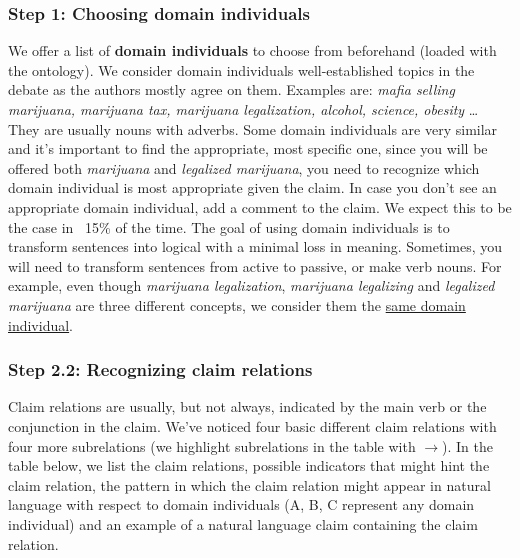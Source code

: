 \subsubsection{Step 1: Choosing domain individuals}

We offer a list of \textbf{domain individuals} to choose from beforehand (loaded with
the ontology). We consider domain individuals well-established topics in the
debate as the authors mostly agree on them. Examples are: \textit{mafia selling
marijuana, marijuana tax, marijuana legalization, alcohol, science, obesity} \dots
They are usually nouns with adverbs. Some domain individuals are very similar
and it’s important to find the appropriate, most specific one, since you will
be offered both \textit{marijuana} and \textit{legalized marijuana}, you need to recognize which
domain individual is most appropriate given the claim. In case you don’t see an
appropriate domain individual, add a comment to the claim. We expect this to be
the case in ~15\% of the time. The goal of using domain individuals is to
transform sentences into logical with a minimal loss in meaning. Sometimes, you
will need to transform sentences from active to passive, or make verb nouns. 
For example, even though \textit{marijuana legalization}, \textit{marijuana legalizing} and
\textit{legalized marijuana} are three different concepts, we consider them the \underline{same
domain individual}. 

\subsubsection{Step 2.2: Recognizing claim relations}

Claim relations are usually, but not always, indicated by the main verb or the
conjunction in the claim. We’ve noticed four basic different claim relations
with four more subrelations (we highlight subrelations in the table with
$\rightarrow$). In the table below, we list the claim relations, possible
indicators that might hint the claim relation, the pattern in which the claim
relation might appear in natural language with respect to domain individuals
(A, B, C represent any domain individual) and an example of a natural language
claim containing the claim relation. 


